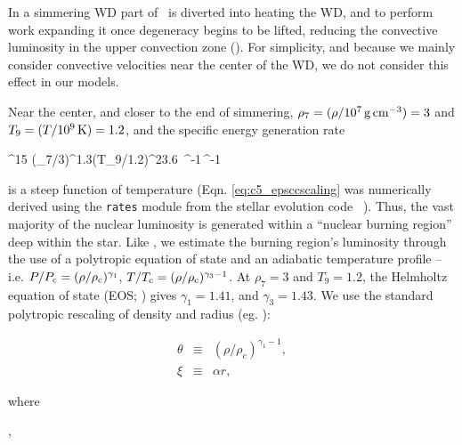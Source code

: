 \noindent In a simmering WD part of \Lcc\ is diverted into heating the WD, and to perform work expanding it once degeneracy begins to be lifted, reducing the convective luminosity in the upper convection zone (\citeal{piroc08}).  For simplicity, and because we mainly consider convective velocities near the center of the WD, we do not consider this effect in our models.  

Near the center, and closer to the end of simmering, $\rho_7 = (\rho/10^7\,\gcc) = 3$ and $T_9 = (T/10^9\,\mathrm{K}) = 1.2$, and the specific energy generation rate

\eqbegin
\epscc {}^{15} \left(\rho_7/3\right)^{1.3}\left(T_9/1.2\right)^{23.6}\,\,\,^{-1}\,^{-1}
\label{eq:c5_epsccscaling}
\eqend

\noindent is a steep function of temperature (Eqn. \ref{eq:c5_epsccscaling} was numerically derived using the \texttt{rates} module from the stellar evolution code \mesa\ \citep{paxt+11}).  Thus, the vast majority of the nuclear luminosity is generated within a ``nuclear burning region'' deep within the star.  Like \citeal{wooswk04}, we estimate the burning region's luminosity through the use of a polytropic equation of state and an adiabatic temperature profile -- i.e. $P/P_\mrm{c} = (\rho/\rhoc)^{\gamma_1}$, $T/\Tc = (\rho/\rhoc)^{\gamma_3-1}$.  At $\rho_7 = 3$ and $T_9 = 1.2$, the Helmholtz equation of state (EOS; \citealt{timms00}) gives $\gamma_1 = 1.41$, and $\gamma_3 = 1.43$.  We use the standard polytropic rescaling of density and radius (eg. \citealt{kippww12}): 

\begin{eqnarray}
\theta &\equiv& (\rho/\rho_c)^{\gamma_1 - 1}, \nonumber \\
\xi &\equiv& \alpha r,
\label{eq:c5_poly_def}
\end{eqnarray}

\noindent where

\eqbegin
\alpha \equiv {},
\label{eq:c5_poly_alpha}
\eqend


